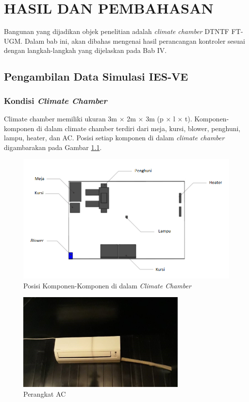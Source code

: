 \chapter{HASIL DAN PEMBAHASAN}
\label{hasil-dan-pembahasan}
Bangunan yang dijadikan objek penelitian adalah \textit{climate chamber} DTNTF FT-UGM. Dalam bab ini, akan dibahas mengenai hasil perancangan kontroler sesuai dengan langkah-langkah yang dijelaskan pada Bab IV.

\section{Pengambilan Data Simulasi IES-VE}

\subsection{Kondisi \textit{Climate Chamber}}

Climate chamber memiliki ukuran 3m $\times$ 2m $\times$ 3m (p $\times$ l $\times$ t). Komponen-komponen di dalam climate chamber terdiri dari meja, kursi, blower, penghuni, lampu, heater, dan AC. Posisi setiap komponen di dalam \textit{climate chamber} digambarakan pada Gambar \ref{fig:5:KondisiChamber}.

\begin{figure}[!h]
	\centering
	\includegraphics[width=1\textwidth]{figures/KondisiChamber}
	\caption{Posisi Komponen-Komponen di dalam \textit{Climate Chamber}}
	\label{fig:5:KondisiChamber}
\end{figure}

\begin{figure}[!h]
	\centering
	\includegraphics[width=0.75\textwidth]{figures/AC}
	\caption{Perangkat AC}
	\label{fig:5:AC}
\end{figure}

